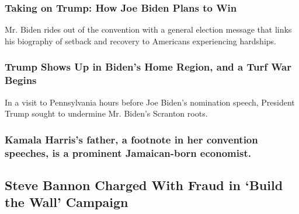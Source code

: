 \href{https://www.nytimes3xbfgragh.onion/2020/08/20/us/politics/biden-dnc-speech-trump.html}{}

\hypertarget{taking-on-trump-how-joe-biden-plans-to-win}{%
\subsubsection{Taking on Trump: How Joe Biden Plans to
Win}\label{taking-on-trump-how-joe-biden-plans-to-win}}

\href{https://www.nytimes3xbfgragh.onion/2020/08/20/us/politics/biden-dnc-speech-trump.html}{}

Mr. Biden rides out of the convention with a general election message
that links his biography of setback and recovery to Americans
experiencing hardships.

\href{https://www.nytimes3xbfgragh.onion/2020/08/20/us/politics/trump-pennsylvania.html}{}

\hypertarget{trump-shows-up-in-bidens-home-region-and-a-turf-war-begins}{%
\subsubsection{Trump Shows Up in Biden's Home Region, and a Turf War
Begins}\label{trump-shows-up-in-bidens-home-region-and-a-turf-war-begins}}

\href{https://www.nytimes3xbfgragh.onion/2020/08/20/us/politics/trump-pennsylvania.html}{}

In a visit to Pennsylvania hours before Joe Biden's nomination speech,
President Trump sought to undermine Mr. Biden's Scranton roots.

\href{https://www.nytimes3xbfgragh.onion/article/kamala-harris-dad-don-harris.html}{}

\hypertarget{kamala-harriss-father-a-footnote-in-her-convention-speeches-is-a-prominent-jamaican-born-economist}{%
\subsubsection{Kamala Harris's father, a footnote in her convention
speeches, is a prominent Jamaican-born
economist.}\label{kamala-harriss-father-a-footnote-in-her-convention-speeches-is-a-prominent-jamaican-born-economist}}

\href{/2020/08/20/nyregion/steve-bannon-arrested-indicted.html}{}

\hypertarget{steve-bannon-charged-with-fraud-in-build-the-wall-campaign}{%
\subsection{Steve Bannon Charged With Fraud in `Build the Wall'
Campaign}\label{steve-bannon-charged-with-fraud-in-build-the-wall-campaign}}


